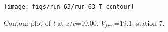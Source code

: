 \begin{figure}[H]
\centering
\texttt{[image: figs/run\_63/run\_63\_T\_contour]}
\caption{Contour plot of $\overline{t}$ at $z/c$=10.00, $V_{free}$=19.1, station 7.}
\label{fig:run_63_T_contour}
\end{figure}


